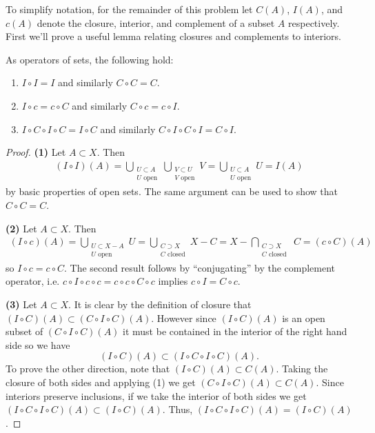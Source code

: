 \documentclass[11pt,letterpaper]{article}
\begin{document}
\begin{changemargin}{1em}{1em}
    To simplify notation, for the remainder of this problem let $C(A)$, $I(A)$, and $c(A)$ denote the closure, interior, and complement of a subset $A$ respectively.
    First we'll prove a useful lemma relating closures and complements to interiors.

    \begin{lemma}
        As operators of sets, the following hold:
        \begin{enumerate}
            \item $I\circ I = I$ and similarly $C\circ C = C$.
            \item $I\circ c = c\circ C$ and similarly $C\circ c = c\circ I$.
            \item $I\circ C \circ I \circ C = I\circ C$ and similarly $C\circ I \circ C \circ I = C\circ I$.
        \end{enumerate}
    \end{lemma}
    \begin{proof}
        \textbf{(1)} Let $A\subset X$. Then 
        \[
            \begin{aligned}
                (I\circ I)(A) = \bigcup_{\substack{U\subset A\\ U \textrm{ open} }}\bigcup_{\substack{V\subset U\\ V \textrm{ open} }}V = \bigcup_{\substack{U \subset A\\ U \textrm{ open} }}U = I(A)
            \end{aligned}    
        \] 
        by basic properties of open sets. The same argument can be used to show that $C\circ C = C$.\medskip

        \textbf{(2)} Let $A\subset X$. Then
        \[\begin{aligned}
            (I\circ c)(A) = \bigcup_{\substack{U\subset X-A\\ U \textrm{ open}}} U = \bigcup_{\substack{C\supset X\\ C \textrm{ closed} }} X-C = X - \bigcap_{\substack{C \supset X\\ C\textrm{ closed }}} C = (c\circ C)(A)
        \end{aligned}\]
        so $I\circ c=c\circ C$. The second result follows by ``conjugating'' by the complement operator, i.e. $c\circ I \circ c \circ c = c\circ c\circ C\circ c$ implies $c\circ I= C\circ c$.\medskip  

        \textbf{(3)} Let $A\subset X$. It is clear by the definition of closure that $(I\circ C)(A) \subset (C\circ I\circ C)(A)$. However since $(I\circ C)(A)$ is an open subset of $(C\circ I\circ C)(A)$ it must be contained in the interior of the right hand side so we have
        \[
            (I\circ C)(A) \subset (I\circ C\circ I\circ C)(A).
        \] 
        To prove the other direction, note that $(I\circ C)(A) \subset C(A)$. Taking the closure of both sides and applying (1) we get $(C\circ I\circ C)(A)\subset C(A)$. Since interiors preserve inclusions, if we take the interior of both sides we get $(I\circ C\circ I\circ C)(A)\subset (I\circ C)(A)$. Thus, $(I\circ C\circ I\circ C)(A)=(I\circ C)(A)$.\medskip
        

\end{proof}
\end{changemargin}
\end{document}
